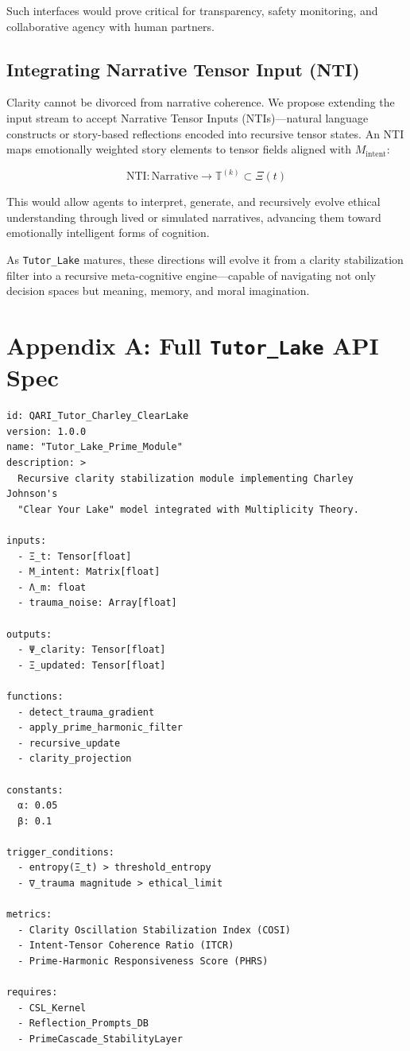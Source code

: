\documentclass[12pt]{article}
\begin{document}
Such interfaces would prove critical for transparency, safety monitoring, and collaborative agency with human partners.

\subsection{Integrating Narrative Tensor Input (NTI)}

Clarity cannot be divorced from narrative coherence. We propose extending the input stream to accept Narrative Tensor Inputs (NTIs)—natural language constructs or story-based reflections encoded into recursive tensor states. An NTI maps emotionally weighted story elements to tensor fields aligned with $M_{\text{intent}}$:

\[
\text{NTI} : \text{Narrative} \rightarrow \mathbb{T}^{(k)} \subset \Xi(t)
\]

This would allow agents to interpret, generate, and recursively evolve ethical understanding through lived or simulated narratives, advancing them toward emotionally intelligent forms of cognition.

As \texttt{Tutor\_Lake} matures, these directions will evolve it from a clarity stabilization filter into a recursive meta-cognitive engine—capable of navigating not only decision spaces but meaning, memory, and moral imagination.


\appendix

\section{Appendix A: Full \texttt{Tutor\_Lake} API Spec}

\begin{verbatim}
id: QARI_Tutor_Charley_ClearLake
version: 1.0.0
name: "Tutor_Lake_Prime_Module"
description: >
  Recursive clarity stabilization module implementing Charley Johnson's
  "Clear Your Lake" model integrated with Multiplicity Theory.

inputs:
  - Ξ_t: Tensor[float]
  - M_intent: Matrix[float]
  - Λ_m: float
  - trauma_noise: Array[float]

outputs:
  - Ψ_clarity: Tensor[float]
  - Ξ_updated: Tensor[float]

functions:
  - detect_trauma_gradient
  - apply_prime_harmonic_filter
  - recursive_update
  - clarity_projection

constants:
  α: 0.05
  β: 0.1

trigger_conditions:
  - entropy(Ξ_t) > threshold_entropy
  - ∇_trauma magnitude > ethical_limit

metrics:
  - Clarity Oscillation Stabilization Index (COSI)
  - Intent-Tensor Coherence Ratio (ITCR)
  - Prime-Harmonic Responsiveness Score (PHRS)

requires:
  - CSL_Kernel
  - Reflection_Prompts_DB
  - PrimeCascade_StabilityLayer
\end{verbatim}
\end{document}
